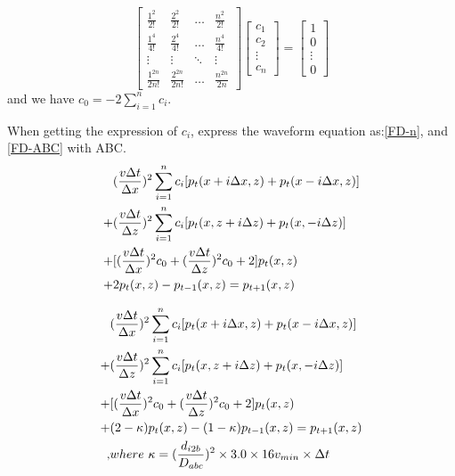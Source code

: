 \documentclass[a4paper, UTF8]{article}
\begin{document}
		\begin{equation}
			\begin{bmatrix}
				\frac{1^2}{2!} & \frac{2^2}{2!} & \ldots & \frac{n^2}{2!}\\
				\frac{1^4}{4!} & \frac{2^4}{4!} & \ldots & \frac{n^4}{4!}\\
				\vdots & \vdots & \ddots & \vdots\\
				\frac{1^{2n}}{2n!} & \frac{2^{2n}}{2n!} & \ldots & \frac{n^{2n}}{2n}
			\end{bmatrix}
			\begin{bmatrix}
				 c_1\\c_2\\\vdots\\c_n
			\end{bmatrix}
			=
			\begin{bmatrix}
				 1\\0\\\vdots\\0
			\end{bmatrix}
			\label{n-order}
		\end{equation}
		 and we have $c_0=-2 \sum_{i=1}^{n}c_i$.

		When getting the expression of \textbf{$c_i$}, express the waveform equation as:\autoref{FD-n}, and \autoref{FD-ABC} with ABC.
		\begin{align}
			&(\frac{v\Delta t}{\Delta x})^2\sum_{i=1}^n c_i[p_t(x+i\Delta x,z)+p_t(x-i\Delta x, z)] \notag\\
			+&(\frac{v\Delta t}{\Delta z})^2\sum_{i=1}^n c_i[p_t(x, z+i\Delta z)+p_t(x, -i\Delta z)] \notag\\
			+&[(\frac{v\Delta t}{\Delta x})^2c_0+(\frac{v\Delta t}{\Delta z})^2c_0+2]p_t(x,z)\notag\\
			+&2p_t(x,z)-p_{t-1}(x,z)=p_{t+1}(x,z)
			\label{FD-n}
		\end{align}

		\begin{align}
			&(\frac{v\Delta t}{\Delta x})^2\sum_{i=1}^n c_i[p_t(x+i\Delta x,z)+p_t(x-i\Delta x, z)] \notag\\
			+&(\frac{v\Delta t}{\Delta z})^2\sum_{i=1}^n c_i[p_t(x, z+i\Delta z)+p_t(x, -i\Delta z)] \notag\\
			+&[(\frac{v\Delta t}{\Delta x})^2c_0+(\frac{v\Delta t}{\Delta z})^2c_0+2]p_t(x,z)\notag\\
			+&(2-\kappa)p_t(x,z)-(1-\kappa)p_{t-1}(x,z)=p_{t+1}(x,z) \notag\\
			,&where\ \kappa=(\frac{d_{i2b}}{D_{abc}})^2\times 3.0 \times  16 v_{min}\times \Delta t 
			\label{FD-ABC}			
		\end{align}
\end{document}
